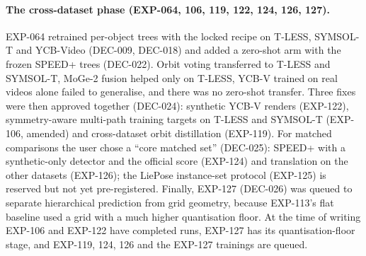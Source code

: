 \paragraph{The cross-dataset phase (EXP-064, 106, 119, 122, 124, 126, 127).}
EXP-064 retrained per-object trees with the locked recipe on T-LESS, SYMSOL-T and YCB-Video (DEC-009, DEC-018) and added a zero-shot arm with the frozen SPEED+ trees (DEC-022). Orbit voting transferred to T-LESS and SYMSOL-T, MoGe-2 fusion helped only on T-LESS, YCB-V trained on real videos alone failed to generalise, and there was no zero-shot transfer. Three fixes were then approved together (DEC-024): synthetic YCB-V renders (EXP-122), symmetry-aware multi-path training targets on T-LESS and SYMSOL-T (EXP-106, amended) and cross-dataset orbit distillation (EXP-119). For matched comparisons the user chose a ``core matched set'' (DEC-025): SPEED+ with a synthetic-only detector and the official score (EXP-124) and translation on the other datasets (EXP-126); the LiePose instance-set protocol (EXP-125) is reserved but not yet pre-registered. Finally, EXP-127 (DEC-026) was queued to separate hierarchical prediction from grid geometry, because EXP-113's flat baseline used a grid with a much higher quantisation floor. At the time of writing EXP-106 and EXP-122 have completed runs, EXP-127 has its quantisation-floor stage, and EXP-119, 124, 126 and the EXP-127 trainings are queued.

